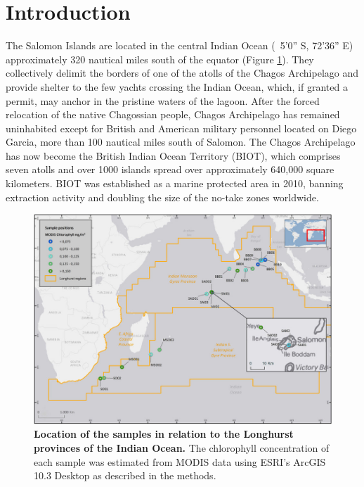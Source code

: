 \section{Introduction}

The Salomon Islands are located in the central Indian Ocean (~5'0'' S, 72'36'' E) approximately 320 nautical miles south of the equator (Figure \ref{Chagos_fig1}). They collectively delimit the borders of one of the atolls of the Chagos Archipelago and provide shelter to the few yachts crossing the Indian Ocean, which, if granted a permit, may anchor in the pristine waters of the lagoon. After the forced relocation of the native Chagossian people, Chagos Archipelago has remained uninhabited except for British and American military personnel located on Diego Garcia, more than 100 nautical miles south of Salomon. The Chagos Archipelago has now become the British Indian Ocean Territory (BIOT), which comprises seven atolls and over 1000 islands spread over approximately 640,000 square kilometers. BIOT was established as a marine protected area in 2010, banning extraction activity and doubling the size of the no-take zones worldwide.\cite{sheppard2012reefs}

\begin{figure}
    \centering
    \includegraphics[width=\textwidth]{Chagos/figures/fig1}
    \caption{\textbf{Location of the samples in relation to the Longhurst provinces of the Indian Ocean.} \cite{rosenberg_role_2007} The chlorophyll concentration of each sample was estimated from MODIS data using ESRI's ArcGIS 10.3 Desktop as described in the methods.}
    \label{Chagos_fig1}
\end{figure}

